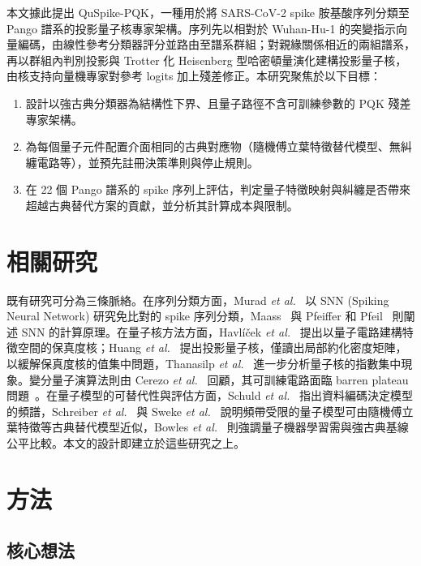 \documentclass[10pt,a4paper]{article}
\begin{document}
本文據此提出 QuSpike-PQK，一種用於將 SARS-CoV-2 spike 胺基酸序列分類至 Pango 譜系的投影量子核專家架構。序列先以相對於 Wuhan-Hu-1 的突變指示向量編碼，由線性參考分類器評分並路由至譜系群組；對親緣關係相近的兩組譜系，再以群組內判別投影與 Trotter 化 Heisenberg 型哈密頓量演化建構投影量子核，由核支持向量機專家對參考 logits 加上殘差修正。本研究聚焦於以下目標：
\begin{enumerate}
    \item 設計以強古典分類器為結構性下界、且量子路徑不含可訓練參數的 PQK 殘差專家架構。
    \item 為每個量子元件配置介面相同的古典對應物（隨機傅立葉特徵替代模型、無糾纏電路等），並預先註冊決策準則與停止規則。
    \item 在 22 個 Pango 譜系的 spike 序列上評估，判定量子特徵映射與糾纏是否帶來超越古典替代方案的貢獻，並分析其計算成本與限制。
\end{enumerate}

\section{相關研究}
\label{sec:related-work}

既有研究可分為三條脈絡。在序列分類方面，Murad \textit{et al.}~\cite{murad2024snn} 以 SNN (Spiking Neural Network) 研究免比對的 spike 序列分類，Maass~\cite{maass1997} 與 Pfeiffer 和 Pfeil~\cite{pfeiffer2018} 則闡述 SNN 的計算原理。在量子核方法方面，Havlí\v{c}ek \textit{et al.}~\cite{havlicek2019} 提出以量子電路建構特徵空間的保真度核；Huang \textit{et al.}~\cite{huang2021power} 提出投影量子核，僅讀出局部約化密度矩陣，以緩解保真度核的值集中問題，Thanasilp \textit{et al.}~\cite{thanasilp2024concentration} 進一步分析量子核的指數集中現象。變分量子演算法則由 Cerezo \textit{et al.}~\cite{cerezo2021vqa} 回顧，其可訓練電路面臨 barren plateau 問題~\cite{mcclean2018barren}。在量子模型的可替代性與評估方面，Schuld \textit{et al.}~\cite{schuld2021effect} 指出資料編碼決定模型的頻譜，Schreiber \textit{et al.}~\cite{schreiber2023surrogates} 與 Sweke \textit{et al.}~\cite{sweke2023rff} 說明頻帶受限的量子模型可由隨機傅立葉特徵等古典替代模型近似，Bowles \textit{et al.}~\cite{bowles2024better} 則強調量子機器學習需與強古典基線公平比較。本文的設計即建立於這些研究之上。

\section{方法}
\label{sec:method}

\subsection{核心想法}
\label{sec:formulation}
\end{document}
